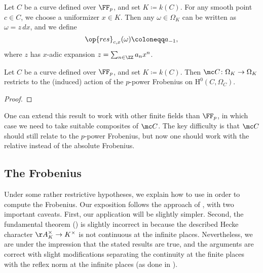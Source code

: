 \documentclass[../thesis.tex]{subfiles}
\begin{document}
\begin{definition}[residue]
	Let $C$ be a curve defined over $\FF_p$, and set $K\coloneqq k(C)$. For any smooth point $c\in C$, we choose a uniformizer $x\in K$. Then any $\omega\in\Omega_K$ can be written as $\omega=z\,dx$, and we define
	\[\op{res}_{c,x}(\omega)\coloneqq a_{-1},\]
	where $z$ has $x$-adic expansion $z=\sum_{n\in\ZZ}a_nx^n$.
\end{definition}
\begin{lemma}
	Let $C$ be a curve defined over $\FF_p$, and set $K\coloneqq k(C)$. Then $\mc C\colon\Omega_K\to\Omega_K$ restricts to the (induced) action of the $p$-power Frobenius on $\mathrm H^0(C,\Omega_C)$.
\end{lemma}
\begin{proof}
	
\end{proof}
\begin{remark}
	One can extend this result to work with other finite fields than $\FF_p$, in which case we need to take suitable composites of $\mc C$. The key difficulty is that $\mc C$ should still relate to the $p$-power Frobenius, but now one should work with the relative instead of the absolute Frobenius.
\end{remark}

\subsection{The Frobenius}
Under some rather restrictive hypotheses, we explain how to use  in order to compute the Frobenius. Our exposition follows the approach of \cite[Section~4]{van-geeman-fermat-curve-hecke}, with two important caveats. First, our application will be slightly simpler. Second, the fundamental theorem () is slightly incorrect in \cite[Subsection~4.4]{van-geeman-fermat-curve-hecke} because the described Hecke character $\AA_K^\times\to K^\times$ is not continuous at the infinite places. Nevertheless, we are under the impression that the stated results are true, and the arguments are correct with slight modifications separating the continuity at the finite places with the reflex norm at the infinite places (as done in ).

\end{document}

